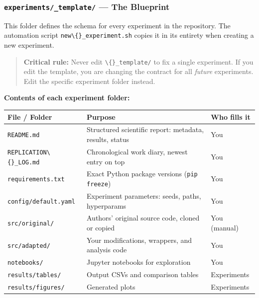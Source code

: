 \subsubsection{\texorpdfstring{\texttt{experiments/\_template/} --- The
Blueprint}{experiments/\_template/ --- The Blueprint}}\label{experiments_template-the-blueprint}

This folder defines the schema for every experiment in the repository.
The automation script \texttt{new\textbackslash\{\}\_experiment.sh}
copies it in its entirety when creating a new experiment.

\begin{quote}
\small \textbf{Critical rule:} Never edit \texttt{\textbackslash\{\}\_template/}
to fix a single experiment. If you edit the template, you are changing
the contract for all \emph{future} experiments. Edit the specific
experiment folder instead.
\end{quote}

\textbf{Contents of each experiment folder:}

{\def\LTcaptype{none} %
\small
\begin{longtable}[]{@{}
  >{\raggedright\arraybackslash}p{}
  >{\raggedright\arraybackslash}p{}
  >{\raggedright\arraybackslash}p{}@{}}
\toprule\noalign{}
\begin{minipage}[b]{\linewidth}\raggedright
File / Folder
\end{minipage} & \begin{minipage}[b]{\linewidth}\raggedright
Purpose
\end{minipage} & \begin{minipage}[b]{\linewidth}\raggedright
Who fills it
\end{minipage} \\
\midrule\noalign{}
\endhead
\bottomrule\noalign{}
\endlastfoot
\texttt{README.md} & Structured scientific report:
metadata, results, status & You \\
\texttt{REPLICATION\textbackslash\{\}\_LOG.md} & Chronological work
diary, newest entry on top & You \\
\texttt{requirements.txt} & Exact Python package
versions (\texttt{pip freeze}) & You \\
\texttt{config/default.yaml} & Experiment parameters:
seeds, paths, hyperparams & You \\
\texttt{src/original/} & Authors' original source code,
cloned or copied & You (manual) \\
\texttt{src/adapted/} & Your modifications, wrappers,
and analysis code & You \\
\texttt{notebooks/} & Jupyter notebooks for exploration
& You \\
\texttt{results/tables/} & Output CSVs and comparison
tables & Experiments \\
\texttt{results/figures/} & Generated plots &
Experiments \\
\end{longtable}
}

